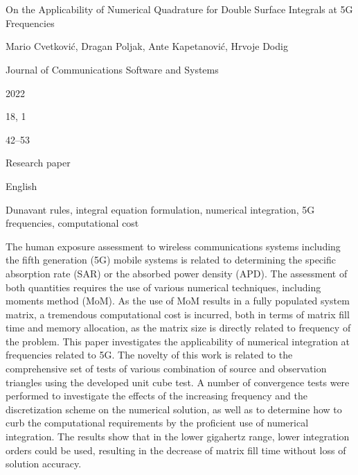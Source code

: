 \cleardoublepage

\chapter{}
\label{chap:d}

\begin{description}[leftmargin=!,labelwidth=\widthof{\bfseries Volume and number}]
    \item[Title] On the Applicability of Numerical Quadrature for Double Surface Integrals at 5G Frequencies
    \item[Authors] Mario Cvetković, Dragan Poljak, Ante Kapetanović, Hrvoje Dodig
    \item[Journal] Journal of Communications Software and Systems
    \item[Year] 2022
    \item[Volume and number] 18, 1
    \item[Pages] 42--53
    \item[Categorization] Research paper
    \item[Language] English
    \item[Keywords] Dunavant rules, integral equation formulation, numerical integration, 5G frequencies, computational cost
    \item[Abstract] The human exposure assessment to wireless communications systems including the fifth generation (5G) mobile systems is related to determining the specific absorption rate (SAR) or the absorbed power density (APD).
    The assessment of both quantities requires the use of various numerical techniques, including moments method (MoM).
    As the use of MoM results in a fully populated system matrix, a tremendous computational cost is incurred, both in terms of matrix fill time and memory allocation, as the matrix size is directly related to frequency of the problem.
    This paper investigates the applicability of numerical integration at frequencies related to 5G.
    The novelty of this work is related to the comprehensive set of tests of various combination of source and observation triangles using the developed unit cube test.
    A number of convergence tests were performed to investigate the effects of the increasing frequency and the discretization scheme on the numerical solution, as well as to determine how to curb the computational requirements by the proficient use of numerical integration.
    The results show that in the lower gigahertz range, lower integration orders could be used, resulting in the decrease of matrix fill time without loss of solution accuracy.

\end{description}
